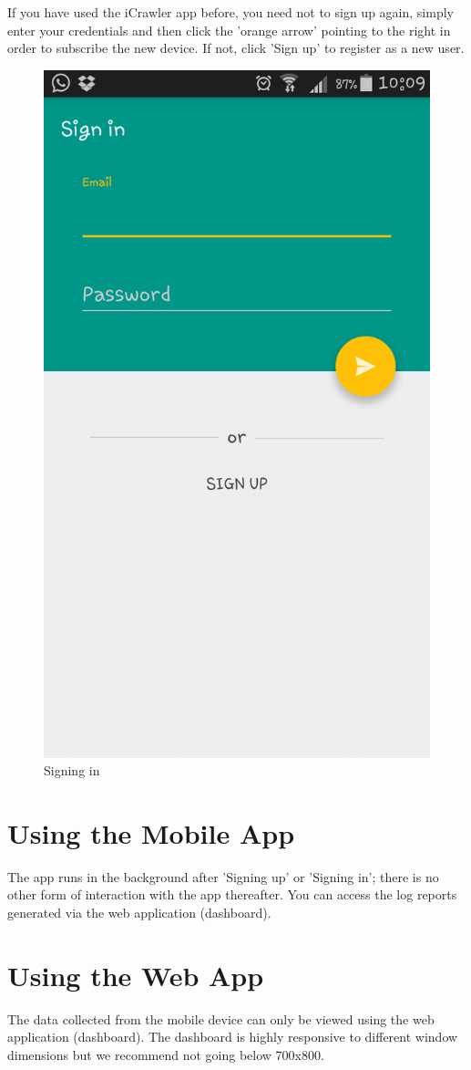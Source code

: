 \documentclass[hidelinks, 12pt, oneside]{article}
\begin{document}
\begin{itemize}
	 	If you have used the iCrawler app before, you need not to sign up again, simply enter your credentials and then
	 	click the 'orange arrow' pointing to the right in order to subscribe the new device. If not, click 'Sign up' to register as a new user.
	 	
	 	 \begin{figure}[h!]
	 	 	\caption{Signing in}
	 	 	\centering 																																		\includegraphics[width=0.5 \textwidth]{img/newImgs/signIn.png}
	 	 \end{figure}
	 	 
	 \end{itemize}\newpage
	 
	 
	\section{Using the Mobile App}
	The app runs in the background after 'Signing up' or 'Signing in'; there is no other form of interaction with 
	the app thereafter. You can access the log reports generated via the web application (dashboard).
	\newline\newline
	
	\section{Using the Web App}
	The data collected from the mobile device can only be viewed using the web application (dashboard). The dashboard is highly responsive to different window dimensions but we recommend not going below 700x800. 
	
\end{document}
